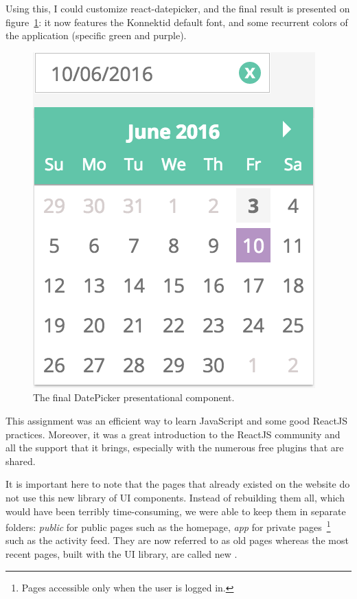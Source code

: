 Using this, I could customize react-datepicker, and the final result is presented on {\sc figure}~\ref{fig:datePicker}: it now features the Konnektid default font, and some recurrent colors of the application (specific green and purple).

\begin{figure}[H]
    \centering
    \includegraphics[scale=0.6]{figure/datePicker.png}
    \caption{The final DatePicker presentational component.}
    \label{fig:datePicker}
\end{figure}

This assignment was an efficient way to learn JavaScript and some good ReactJS practices. Moreover, it was a great introduction to the ReactJS community and all the support that it brings, especially with the numerous free plugins that are shared.

It is important here to note that the pages that already existed on the website do not use this new library of UI components. Instead of rebuilding them all, which would have been terribly time-consuming, we were able to keep them in separate folders: \textit{public} for public pages such as the homepage, \textit{app} for private pages~\footnote{Pages accessible only when the user is logged in.} such as the activity feed. They are now referred to as \guillemotleft{} old \guillemotright{} pages whereas the most recent pages, built with the UI library, are called \guillemotleft{} new \guillemotright{}.


